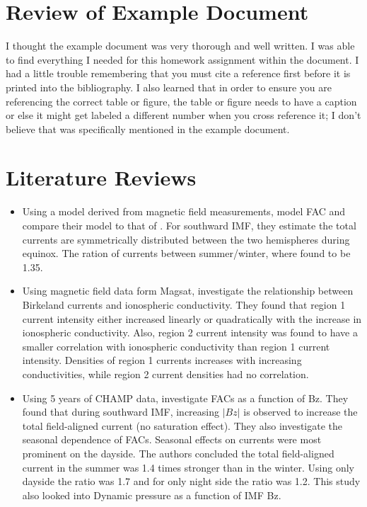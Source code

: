 \documentclass[12pt, letterpaper]{article} %
\begin{document}
\section{Review of Example Document} %
I thought the example document was very thorough and well written. I was able to find everything I needed for this homework assignment within the document. I had a little trouble remembering that you must cite a reference first before it is printed into the bibliography. I also learned that in order to ensure you are referencing the correct table or figure, the table or figure needs to have a caption or else it might get labeled a different number when you cross reference it; I don't believe that was specifically mentioned in the example document. 

\section{Literature Reviews}%
\begin{itemize} %
    \item %
    Using a model derived from magnetic field measurements, \cite{papitashvili2002} %
    model FAC and compare their model to that of \cite{weimer2001}. %
    For southward IMF, they estimate the total currents are symmetrically distributed between the two hemispheres during equinox. The ration of currents between summer/winter, where found to be 1.35.
    \item %
    Using magnetic field data form Magsat, \cite{Juusola2009} %
    investigate the relationship between Birkeland currents and ionospheric conductivity. They found that region 1 current intensity either increased linearly or quadratically with the increase in ionospheric conductivity. Also, region 2 current intensity was found to have a smaller correlation with ionospheric conductivity than region 1 current intensity. Densities of region 1 currents increases with increasing conductivities, while region 2 current densities had no correlation. 
    \item %
    Using 5 years of CHAMP data, \cite{fujii1987} %
    investigate FACs as a function of Bz. They found that during southward IMF, increasing $|Bz|$ is observed to increase the total field-aligned current (no saturation effect). They also investigate the seasonal dependence of FACs. Seasonal effects on currents were most prominent on the dayside. The authors concluded the total field-aligned current in the summer was 1.4 times stronger than in the winter. Using only dayside the ratio was 1.7 and for only night side the ratio was 1.2.  This study also looked into Dynamic pressure as a function of IMF Bz. 
\end{itemize} %
\end{document}
